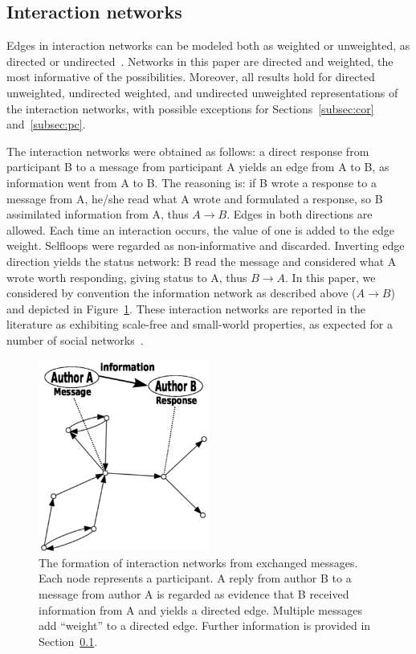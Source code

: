 \documentclass[review]{elsarticle}
\begin{document}
\subsection{Interaction networks}\label{intNet}
Edges in interaction networks can be modeled both as weighted or unweighted, as directed or undirected~\cite{bird,newmanCommunityDirected,newmanCommunity2013}.
Networks in this paper are directed and weighted, the most informative of the possibilities. Moreover, all results hold for directed unweighted, undirected weighted, and undirected unweighted representations of the interaction networks,
with possible exceptions for Sections~\ref{subsec:cor} and~\ref{subsec:pc}.

The interaction networks were obtained as follows:
a direct response from participant B to a message from participant A yields an edge from A to B,
as information went from A to B.
The reasoning is: if B wrote a response to a message from A,
he/she read what A wrote and formulated a response, so B assimilated information from A, thus $A \rightarrow B$.
Edges in both directions are allowed.
Each time an interaction occurs, the value of one is added to the edge weight.
Selfloops were regarded as non-informative and discarded.
Inverting edge direction yields the status network:
B read the message and considered what A wrote worth responding,
giving status to A, thus $B\rightarrow A$.
In this paper, we considered by convention the information network as described above ($A\rightarrow B$)
and depicted in Figure~\ref{formationNetwork}.
These interaction networks are reported in the literature as exhibiting scale-free
and small-world properties, as expected for a number of social networks~\cite{bird,newmanBook}.

\begin{figure}[!h]
\centering
\includegraphics[width=0.5\textwidth]{figs/criaRede3_}
\caption{The formation of interaction networks from exchanged messages. Each node represents a participant. A reply from author B to a message from author A is regarded as evidence that B received information from A and yields a directed edge. Multiple messages add ``weight'' to a directed edge. Further information is provided in Section~\ref{intNet}.}
\label{formationNetwork}
\end{figure}
\end{document}
